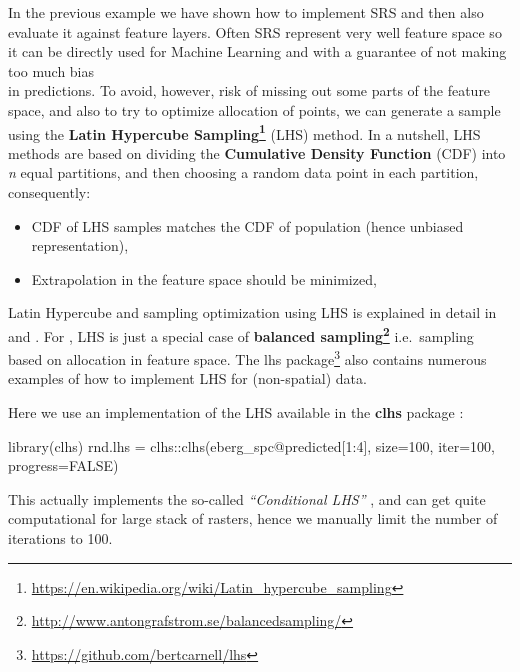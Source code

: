 \documentclass[
  graybox,natbib,nospthms]{svmono}
\newenvironment{Shaded}{\begin{snugshade}}{\end{snugshade}}
\newcommand{\AttributeTok}[1]{\textcolor[rgb]{0.61,0.61,0.61}{#1}}
\newcommand{\ConstantTok}[1]{\textcolor[rgb]{0,0,0}{#1}}
\newcommand{\DecValTok}[1]{\textcolor[rgb]{0.06,0.06,0.06}{#1}}
\newcommand{\FunctionTok}[1]{\textcolor[rgb]{0,0,0}{#1}}
\newcommand{\NormalTok}[1]{#1}
\newcommand{\OtherTok}[1]{\textcolor[rgb]{0.37,0.37,0.37}{#1}}
\newcommand{\SpecialCharTok}[1]{\textcolor[rgb]{0,0,0}{#1}}
\providecommand{\tightlist}{%
  \setlength{\itemsep}{0pt}\setlength{\parskip}{0pt}}
\providecommand{\tightlist}{\setlength{\itemsep}{0pt}\setlength{\parskip}{0pt}}
\renewcommand{\href}[2]{#2 (\url{#1})}
\renewcommand{\href}[2]{#2\footnote{\url{#1}}}
\begin{document}
In the previous example we have shown how to implement SRS and then also evaluate it
against feature layers. Often SRS represent very well feature space so it can be
directly used for Machine Learning and with a guarantee of not making too much bias\\
in predictions. To avoid, however, risk of missing out some parts of the feature space,
and also to try to optimize allocation of points, we can generate a sample using the
\textbf{\href{https://en.wikipedia.org/wiki/Latin_hypercube_sampling}{Latin Hypercube Sampling}} (LHS) method. In a nutshell, LHS methods are based on
dividing the \textbf{Cumulative Density Function} (CDF) into \emph{n} equal partitions, and
then choosing a random data point in each partition, consequently:

\begin{itemize}
\tightlist
\item
  CDF of LHS samples matches the CDF of population (hence unbiased representation),\\
\item
  Extrapolation in the feature space should be minimized,
\end{itemize}

Latin Hypercube and sampling optimization using LHS is explained in detail in \citet{minasny2006conditioned}
and \citet{shields2016generalization}. For \citet{brus2015balanced}, LHS is just a special case
of \textbf{\href{http://www.antongrafstrom.se/balancedsampling/}{balanced sampling}} i.e.~sampling based on allocation in feature space.
The \href{https://github.com/bertcarnell/lhs}{lhs package} also contains numerous examples of
how to implement LHS for (non-spatial) data.

Here we use an implementation of the LHS available in the \textbf{clhs} package \citep{Roudier2011}:

\begin{Shaded}
\begin{Highlighting}[]
\FunctionTok{library}\NormalTok{(clhs)}
\NormalTok{rnd.lhs }\OtherTok{=}\NormalTok{ clhs}\SpecialCharTok{::}\FunctionTok{clhs}\NormalTok{(eberg\_spc}\SpecialCharTok{@}\NormalTok{predicted[}\DecValTok{1}\SpecialCharTok{:}\DecValTok{4}\NormalTok{], }\AttributeTok{size=}\DecValTok{100}\NormalTok{, }\AttributeTok{iter=}\DecValTok{100}\NormalTok{, }\AttributeTok{progress=}\ConstantTok{FALSE}\NormalTok{)}
\end{Highlighting}
\end{Shaded}

This actually implements the so-called \emph{``Conditional LHS''} \citep{minasny2006conditioned},
and can get quite computational for large stack of rasters, hence we manually limit the
number of iterations to 100.
\end{document}
